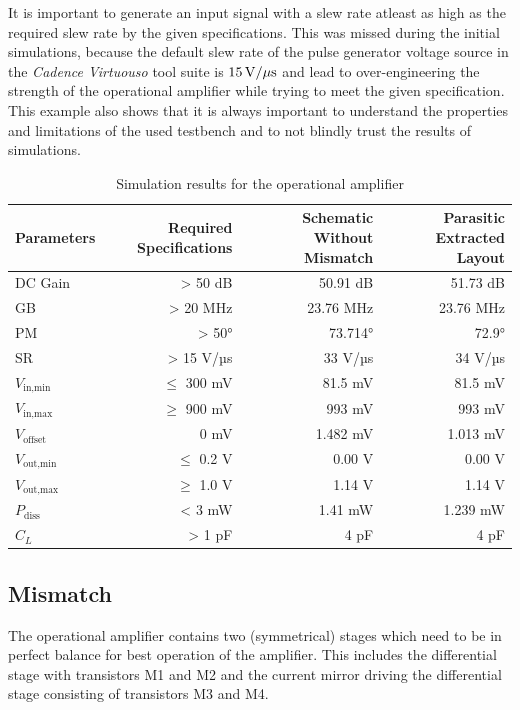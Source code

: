 \documentclass[parskip,oneside,colorbacktitle,10pt,accentcolor=tud1b,table]{tudreport}
\begin{document}
{It is important to generate an input signal with a slew rate atleast as high as the required slew rate by the given specifications. This was missed during the initial simulations, because the default slew rate of the pulse generator voltage source in the \textit{Cadence Virtuouso} tool suite is $\unit[15]{V/ \mu s}$ and lead to over-engineering the strength of the operational amplifier while trying to meet the given specification. This example also shows that it is always important to understand the properties and limitations of the used testbench and to not blindly trust the results of simulations.

\begin{table}[H]
  \centering
    \begin{tabular}{|l|r|r|r|}
    \hline
    \textbf{Parameters} & \textbf{Required Specifications} & \textbf{Schematic Without Mismatch} & \textbf{Parasitic Extracted Layout} \\
    \hline
    DC Gain & > 50 dB & 50.91 dB & 51.73 dB \\
    \hline
    GB & > 20 MHz & 23.76 MHz & 23.76 MHz \\
    \hline
    PM & > 50° & 73.714° & 72.9° \\
    \hline
    SR & > 15 V/µs & 33 V/µs & 34 V/µs \\
    \hline
    $V_\text{in,min}$ & $\leq$ 300 mV & 81.5 mV & 81.5 mV  \\
    \hline
    $V_\text{in,max}$ & $\geq$ 900 mV & 993 mV & 993 mV \\
    \hline
    $V_\text{offset}$ & 0 mV & 1.482 mV & 1.013 mV \\
    \hline
    $V_\text{out,min}$ & $\leq$ 0.2 V & 0.00 V & 0.00 V \\
    \hline
    $V_\text{out,max}$ & $\geq$ 1.0 V & 1.14 V & 1.14 V \\
    \hline
    $P_\text{diss}$ & < 3 mW &  1.41 mW  & 1.239 mW \\
    \hline
    $C_L$ & > 1 pF & 4 pF & 4 pF \\
    \hline
    \end{tabular}%
  \caption{Simulation results for the operational amplifier}
  \label{tab:opamp_results}%
\end{table}%

\subsection{Mismatch}

The operational amplifier contains two (symmetrical) stages which need to be in perfect balance for best operation of the amplifier. This includes the differential stage with transistors M1 and M2 and the current mirror driving the differential stage consisting of transistors M3 and M4.

}
\end{document}
